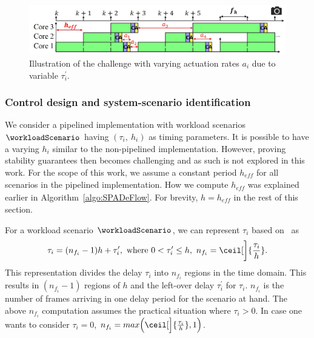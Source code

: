 \begin{figure}[t]
\centerline{
    \includegraphics[width=\textwidth]{images/tau_dash_issue.jpg}
    }
    \caption{Illustration of the challenge with varying actuation rates $a_i$ due to variable $\tau_i^\prime$.}
    \label{fig:ch7_tau_dash_issue}
\end{figure}
\subsubsection{Control design and system-scenario identification}
\label{sec:ch7_controlDesignPipelined}
We consider a pipelined implementation with workload scenarios $\workloadScenario$ having $(\tau_i,\ h_i)$ as timing parameters.
It is possible to have a varying $h_i$ similar to the non-pipelined implementation.
However, proving stability guarantees then becomes challenging and as such is not explored in this work.
For the scope of this work, we assume a constant period $h_{\mathit{eff}}$ for all scenarios in the pipelined implementation.
How we compute $h_{\mathit{eff}}$ was explained earlier in Algorithm~\ref{algo:SPADeFlow}.
For brevity, $h=h_\mathit{eff}$ in the rest of this section.

For a workload scenario $\workloadScenario$, we can represent $\tau_i$ based on~\cite{ogata1995discrete} as
\begin{equation}
     \tau_i = (n_{f_i}-1)h+\tau_i^{\prime},\text{ where } 0<\tau_i^{\prime}\le h,\ n_{f_i}=\ceil[\bigg]{\frac{\tau_i}{h}}. \label{eq:ch7_tau_dash}
\end{equation}
This representation divides the delay $\tau_i$ into $n_{f_i}$ regions in the time domain.
This results in $(n_{f_i}-1)$ regions of $h$ and the left-over delay $\tau_i^\prime$ for $\tau_i$. 
$n_{f_i}$ is the number of frames arriving in one delay period for the scenario at hand. 
The above $n_{f_i}$ computation assumes the practical situation where $\tau_i>0$. 
In case one wants to consider $\tau_i=0$, $n_{f_i}=max\Big(\ceil[\Big]{\frac{\tau_i}{h}},1\Big)$.

